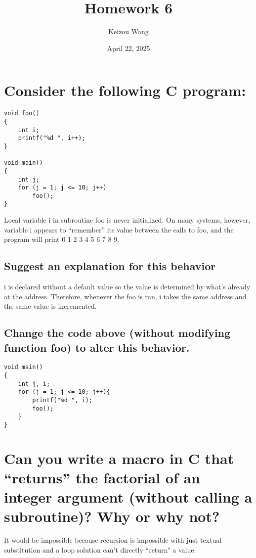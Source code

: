 \documentclass[letterpaper]{article}
\title{Homework 6}
\author{Keizou Wang}
\date{April 22, 2025}
\begin{document}
\maketitle

\section{Consider the following C program:}
\begin{adjustwidth}{2.35em}{0pt}
\begin{lstlisting}
void foo()
{
	int i;
	printf("%d ", i++);
}

void main()
{
	int j;
	for (j = 1; j <= 10; j++)
		foo();
}
\end{lstlisting}
Local variable i in subroutine foo is never initialized. On many systems, however, variable i appears to “remember” its value between the calls to foo, and the program will print 0 1 2 3 4 5 6 7 8 9.
\end{adjustwidth}
\subsection{Suggest an explanation for this behavior}
\begin{adjustwidth}{2.35em}{0pt}
i is declared without a default value so the value is determined by what's already at the address. Therefore, whenever the foo is ran, i takes the same address and the same value is incremented.
\end{adjustwidth}
\subsection{Change the code above (without modifying function foo) to alter this behavior.}
\begin{adjustwidth}{2.35em}{0pt}
\begin{lstlisting}
void main()
{
	int j, i;
	for (j = 1; j <= 10; j++){
		printf("%d ", i);
		foo();
	}
}
\end{lstlisting}
\end{adjustwidth}

\section{Can you write a macro in C that “returns” the factorial of an integer argument (without calling a subroutine)? Why or why not?}
\begin{adjustwidth}{2.35em}{0pt}
It would be impossible because recursion is impossible with just textual substitution and a loop solution can't directly ``return" a value.
\end{adjustwidth}
\end{document}
